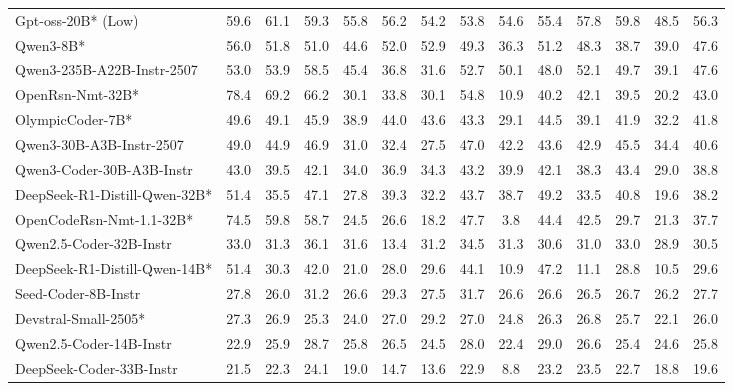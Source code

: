 \begin{table}[hbt]
{\begin{tabular}{l *{13}{c}}
\rowcolor{gray!10}							
Gpt-oss-20B* (Low)&	59.6&	61.1&	59.3&	55.8&	56.2&	54.2&	53.8&	54.6&	55.4&	57.8&	59.8&	48.5&	56.3\\												
Qwen3-8B*&	56.0&	51.8&	51.0&	44.6&	52.0&	52.9&	49.3&	36.3&	51.2&	48.3&	38.7&	39.0&	47.6\\				

\rowcolor{gray!10}		
Qwen3-235B-A22B-Instr-2507&	53.0&	53.9&	58.5&	45.4&	36.8&	31.6&	52.7&	50.1&	48.0&	52.1&	49.7&	39.1&	47.6\\															
OpenRsn-Nmt-32B*&	78.4&	69.2&	66.2&	30.1&	33.8&	30.1&	54.8&	10.9&	40.2&	42.1&	39.5&	20.2&	43.0\\													\rowcolor{gray!10}
OlympicCoder-7B*&	49.6&	49.1&	45.9&	38.9&	44.0&	43.6&	43.3&	29.1&	44.5&	39.1&	41.9&	32.2&	41.8\\															
Qwen3-30B-A3B-Instr-2507&	49.0&	44.9&	46.9&	31.0&	32.4&	27.5&	47.0&	42.2&	43.6&	42.9&	45.5&	34.4&	40.6\\			

\rowcolor{gray!10}
Qwen3-Coder-30B-A3B-Instr&	43.0&	39.5&	42.1&	34.0&	36.9&	34.3&	43.2&	39.9&	42.1&	38.3&	43.4&	29.0&	38.8\\														
DeepSeek-R1-Distill-Qwen-32B*&	51.4&	35.5&	47.1&	27.8&	39.3&	32.2&	43.7&	38.7&	49.2&	33.5&	40.8&	19.6&	38.2\\	

\rowcolor{gray!10}
OpenCodeRsn-Nmt-1.1-32B*&	74.5&	59.8&	58.7&	24.5&	26.6&	18.2&	47.7&	3.8&	44.4&	42.5&	29.7&	21.3&	37.7\\															
Qwen2.5-Coder-32B-Instr&	33.0&	31.3&	36.1&	31.6&	13.4&	31.2&	34.5&	31.3&	30.6&	31.0&	33.0&	28.9&	30.5\\		

\rowcolor{gray!10}
DeepSeek-R1-Distill-Qwen-14B*&	51.4&	30.3&	42.0&	21.0&	28.0&	29.6&	44.1&	10.9&	47.2&	11.1&	28.8&	10.5&	29.6\\															
Seed-Coder-8B-Instr&	27.8&	26.0&	31.2&	26.6&	29.3&	27.5&	31.7&	26.6&	26.6&	26.5&	26.7&	26.2&	27.7\\	

\rowcolor{gray!10}
Devstral-Small-2505*&	27.3&	26.9&	25.3&	24.0&	27.0&	29.2&	27.0&	24.8&	26.3&	26.8&	25.7&	22.1&	26.0\\															
Qwen2.5-Coder-14B-Instr&	22.9&	25.9&	28.7&	25.8&	26.5&	24.5&	28.0&	22.4&	29.0&	26.6&	25.4&	24.6&	25.8\\	

\rowcolor{gray!10}
DeepSeek-Coder-33B-Instr &	21.5&	22.3&	24.1&	19.0&	14.7&	13.6&	22.9&	8.8&	23.2&	23.5&	22.7&	18.8&	19.6\\														

\bottomrule
\end{tabular}%
}
\end{table}
